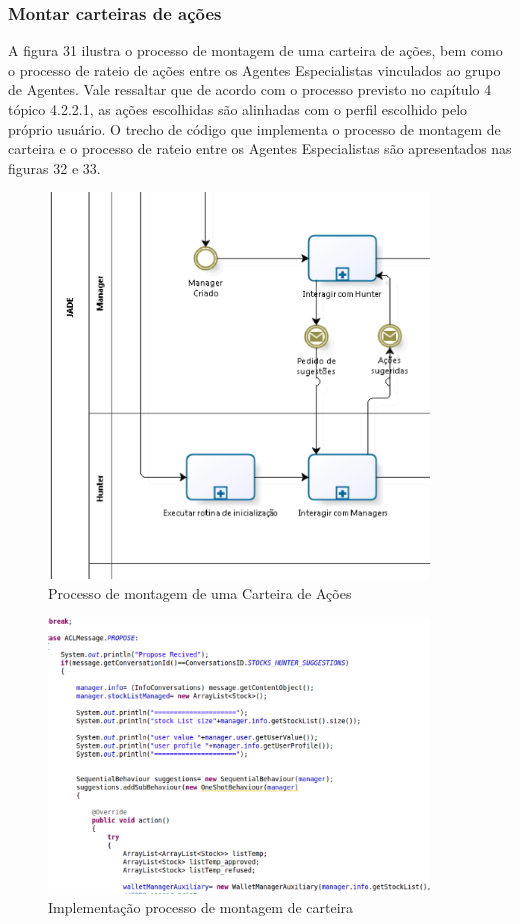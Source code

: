 \subsubsection{Montar carteiras de ações}

A figura 31 ilustra o processo de montagem de uma carteira de ações, bem como o processo de rateio de ações entre os Agentes Especialistas vinculados ao grupo de Agentes. Vale ressaltar que de acordo com o processo previsto no capítulo 4 tópico 4.2.2.1, as ações escolhidas são alinhadas com o perfil escolhido pelo próprio usuário. O trecho de código que implementa o processo de montagem de carteira e o processo de rateio entre os Agentes Especialistas são apresentados nas figuras 32 e 33.

\begin{figure}[h]
\centering
\label{f31}
\includegraphics[width=0.9\textwidth]{figuras/f31}
\caption{Processo de montagem de uma Carteira de Ações}
\end{figure}

\begin{figure}[h]
\centering
\label{f32}
\includegraphics[width=0.9\textwidth]{figuras/f32}
\caption{Implementação processo de montagem de carteira}
\end{figure}

